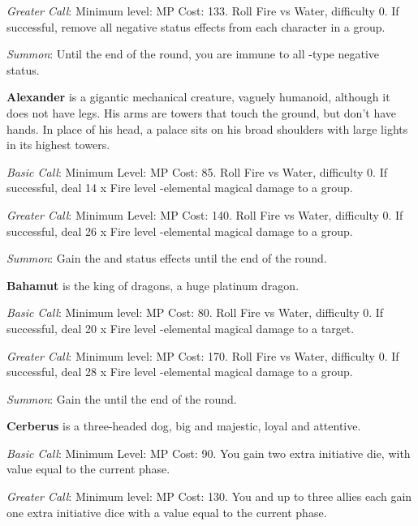 \begin{multicols}{2}
    \textit{Greater Call}: Minimum level:  MP Cost: 133. Roll Fire vs Water, difficulty 0. If successful, remove all negative status effects from each character in a group.
    
    \textit{Summon}: Until the end of the round, you are immune to all -type  negative status.
    
    \textbf{Alexander} is a gigantic mechanical creature, vaguely humanoid, although it does not have legs. His arms are towers that touch the ground, but don’t have hands. In place of his head, a palace sits on his broad shoulders with large lights in its highest towers.
    
    \textit{Basic Call}: Minimum Level:  MP Cost: 85. Roll Fire vs Water, difficulty 0. If successful, deal 14 x Fire level -elemental magical damage to a group.
    
    \textit{Greater Call}: Minimum Level:  MP Cost: 140. Roll Fire vs Water, difficulty 0. If successful, deal 26 x Fire level -elemental magical damage to a group.
    
    \textit{Summon}: Gain the   and   status effects until the end of the round.
    
    \textbf{Bahamut} is the king of dragons, a huge platinum dragon.
    
    \textit{Basic Call}: Minimum level:  MP Cost: 80. Roll Fire vs Water, difficulty 0. If successful, deal 20 x Fire level -elemental magical damage to a target.
    
    \textit{Greater Call}: Minimum level:  MP Cost: 170. Roll Fire vs Water, difficulty 0. If successful, deal 28 x Fire level -elemental magical damage to a group.
    
    \textit{Summon}: Gain the  until the end of the round.
    
    \textbf{Cerberus} is a three-headed dog, big and majestic, loyal and attentive.
    
    \textit{Basic Call}: Minimum Level:  MP Cost: 90. You gain two extra initiative die, with value equal to the current phase.
    
    \textit{Greater Call}: Minimum level:  MP Cost: 130. You and up to three allies each gain one extra initiative dice with a value equal to the current phase.
    

\end{multicols}
